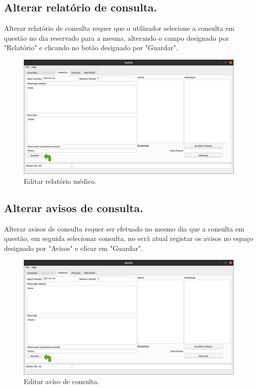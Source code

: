 \documentclass[11pt,a4paper,twoside]{article}
\begin{document}
\subsection{Alterar relatório de consulta.}
Alterar relatório de consulta requer que o utilizador selecione a consulta em questão no dia reservado para a mesma, alterando o campo designado por "Relatório" e clicando no botão designado por "Guardar".

\begin{figure}[H]
	\centering
	\includegraphics[width=0.9\linewidth]{image/medico/relatorio.png}
	\caption{Editar relatório médico.}
	\label{fig:editarrealtorio}
\end{figure}

\subsection{Alterar avisos de consulta.}
Alterar avisos de consulta requer ser efetuado no mesmo dia que a consulta em questão, em seguida selecionar consulta, no ecrã atual registar os avisos no espaço designado por "Avisos" e clicar em "Guardar".

\begin{figure}[H]
	\centering
	\includegraphics[width=0.9\linewidth]{image/medico/relatorio.png}
	\caption{Editar aviso de consulta.}
	\label{fig:editaraviso}
\end{figure}
\end{document}
